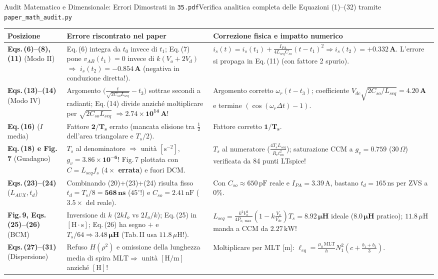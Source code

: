 \documentclass[aspectratio=169,9pt]{beamer}
\newcommand{\A}{\,\text{A}}
\newcommand{\kW}{\,\text{kW}}
\newcommand{\uH}{\,\mu\text{H}}
\newcommand{\pF}{\,\text{pF}}
\newcommand{\nF}{\,\text{nF}}
\newcommand{\ns}{\,\text{ns}}
\newcommand{\Ohm}{\,\Omega}
\begin{document}
\begin{frame}{Audit Matematico e Dimensionale: Errori Dimostrati in \texttt{35.pdf}}{Verifica analitica completa delle Equazioni (1)--(32) tramite \texttt{paper\_math\_audit.py}}
  \scriptsize
  \setlength{\tabcolsep}{3.2pt}
  \renewcommand{\arraystretch}{1.12}
  \begin{tabular}{@{}>{\raggedright\arraybackslash}p{2.25cm}>{\raggedright\arraybackslash}p{5.55cm}>{\raggedright\arraybackslash}p{6.15cm}@{}}
    \toprule
    \textbf{Posizione} & \textbf{Errore riscontrato nel paper} & \textbf{Correzione fisica e impatto numerico} \\
    \midrule
    \textbf{Eqs.\,(6)--(8), (11)} (Modo II) & Eq.\,(6) integra da $t_0$ invece di $t_1$; Eq.\,(7) pone $v_{AB}(t_1)=0$ invece di $k(V_o+2V_d)$ $\Rightarrow$ $i_s(t_2)=\mathbf{-0.854\A}$ (\color{AlertRed}negativa in conduzione diretta!). & $i_s(t)=i_s(t_1)+\frac{I_{PA}}{4L_{seq}C_{so}}(t-t_1)^2 \Rightarrow i_s(t_2)=\mathbf{+0.332\A}$. L'errore si propaga in Eq.\,(11) (con fattore 2 spurio). \\
    \textbf{Eqs.\,(13)--(14)} (Modo IV) & Argomento $\bigl(\frac{t}{\sqrt{2C_{so}L_{seq}}}-t_3\bigr)$ sottrae secondi a radianti; Eq.\,(14) divide anzich\'e moltiplicare per $\sqrt{2C_{so}L_{seq}}$ $\Rightarrow \mathbf{2.74\times 10^{14}\A}$! & Argomento corretto $\omega_r(t-t_3)$; coefficiente $V_{dc}\sqrt{2C_{so}/L_{seq}} = \mathbf{4.20\A}$ e termine $(\cos(\omega_r\Delta t)-1)$. \\
    \textbf{Eq.\,(16)} ($I$ media) & Fattore $\mathbf{2/T_s}$ errato (mancata elisione tra $\frac{1}{2}$ dell'area triangolare e $T_s/2$). & Fattore corretto $\mathbf{1/T_s}$. \\
    \textbf{Eq.\,(18) e Fig.\,7} (Guadagno) & $T_s$ al denominatore $\Rightarrow$ unit\`a $[\text{s}^{-2}]$, $g_v=\mathbf{3.86\times 10^{-6}}$! Fig.\,7 plottata con $C=L_{seq}f_s$ (\textbf{$4\times$ errata}) e fuori DCM. & $T_s$ al numeratore ($\frac{4T_s L_{seq}}{R_e t_{on}^2}$); saturazione CCM a $g_v=0.759$ ($30\Ohm$) verificata da 84 punti LTspice! \\
    \textbf{Eqs.\,(23)--(24)} ($L_{AUX}, t_d$) & Combinando (20)+(23)+(24) risulta fisso $t_d=T_s/8=\mathbf{568\ns}$ ($45^\circ$!) e $C_{so}=2.41\nF$ ($3.5\times$ del reale). & Con $C_{so}\approx 650\pF$ reale e $I_{PA}=3.39\A$, bastano $t_d = 165\ns$ per ZVS a 0\%. \\
    \textbf{Fig.\,9, Eqs.\,(25)--(26)} (BCM) & Inversione di $k$ ($2kI_o$ vs $2I_o/k$); Eq.\,(25) in $[\text{H}\cdot\text{s}]$; Eq.\,(26) ha segno $+$ e $T_s/64 \Rightarrow \mathbf{3.48\uH}$ (Tab.\,II usa $11.8\uH$!). & $L_{seq}=\frac{k^2 V_o^2}{4P_{o,\max}}(1-k\frac{V_o}{V_{dc}})T_s = \mathbf{8.92\uH}$ ideale ($\mathbf{8.0\uH}$ pratico); $11.8\uH$ manda a CCM da $2.27\kW$! \\
    \textbf{Eqs.\,(27)--(31)} (Dispersione) & Refuso $H(\rho^2)$ e omissione della lunghezza media di spira $\mathrm{MLT} \Rightarrow$ unit\`a $[\text{H/m}]$ anzich\'e $[\text{H}]$! & Moltiplicare per $\mathrm{MLT}$ [m]: $\ell_{eq}=\frac{\mu_0\,\mathrm{MLT}}{h}N_1^2(c+\frac{b_1+b_2}{3})$. \\
    \bottomrule
  \end{tabular}
\end{frame}
\end{document}
